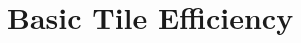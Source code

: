 \documentclass{book}
\begin{document}
%
%


\part{Basic Tile Efficiency} \label{part:tile}


%
%
%
%
%
%
%
%
%
%
%
%
%
%
%
%
%
\end{document}
